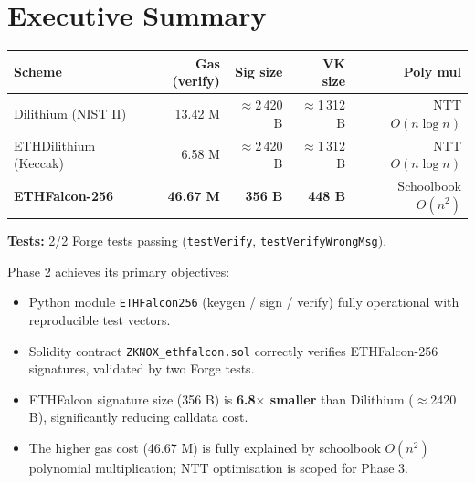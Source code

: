 \documentclass[11pt,a4paper]{article}
\begin{document}
\tableofcontents
\newpage

\section{Executive Summary}

\begin{resultbox}
\begin{center}
\begin{tabular}{lrrrr}
\toprule
\textbf{Scheme} & \textbf{Gas (verify)} & \textbf{Sig size} & \textbf{VK size} & \textbf{Poly mul} \\
\midrule
Dilithium (NIST II)     & 13.42 M & $\approx$2\,420 B & $\approx$1\,312 B & NTT $O(n\log n)$ \\
ETHDilithium (Keccak)   &  6.58 M & $\approx$2\,420 B & $\approx$1\,312 B & NTT $O(n\log n)$ \\
\textbf{ETHFalcon-256}  & \textbf{46.67 M} & \textbf{356 B} & \textbf{448 B} & Schoolbook $O(n^2)$ \\
\bottomrule
\end{tabular}
\end{center}
\vspace{4pt}
\textbf{Tests:} 2/2 Forge tests passing (\texttt{testVerify}, \texttt{testVerifyWrongMsg}).
\end{resultbox}

\medskip

Phase 2 achieves its primary objectives:
\begin{itemize}
  \item[\checkmark] Python module \texttt{ETHFalcon256} (keygen / sign / verify) fully operational
  with reproducible test vectors.
  \item[\checkmark] Solidity contract \texttt{ZKNOX\_ethfalcon.sol} correctly verifies ETHFalcon-256
  signatures, validated by two Forge tests.
  \item[\checkmark] ETHFalcon signature size (356 B) is \textbf{6.8$\times$ smaller} than
  Dilithium ($\approx$2420 B), significantly reducing calldata cost.
  \item[\checkmark] The higher gas cost (46.67 M) is fully explained by schoolbook $O(n^2)$
  polynomial multiplication; NTT optimisation is scoped for Phase 3.
\end{itemize}

\end{document}
